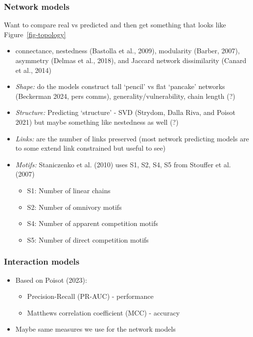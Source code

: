 \documentclass[
  letterpaper,
  DIV=11,
  numbers=noendperiod]{scrartcl}
\providecommand{\tightlist}{%
  \setlength{\itemsep}{0pt}\setlength{\parskip}{0pt}}\usepackage{longtable,booktabs,array}
\begin{document}
\subsubsection{Network models}\label{network-models}

Want to compare real vs predicted and then get something that looks like
Figure~\ref{fig-topology}

\begin{itemize}
\item
  connectance, nestedness (Bastolla et al., 2009), modularity (Barber,
  2007), asymmetry (Delmas et al., 2018), and Jaccard network
  dissimilarity (Canard et al., 2014)
\item
  \emph{Shape:} do the models construct tall `pencil' vs flat `pancake'
  networks (Beckerman 2024, pers comms), generality/vulnerability, chain
  length (?)
\item
  \emph{Structure:} Predicting `structure' - SVD (Strydom, Dalla Riva,
  and Poisot 2021) but maybe something like nestedness as well (?)
\item
  \emph{Links:} are the number of links preserved (most network
  predicting models are to some extend link constrained but useful to
  see)
\item
  \emph{Motifs:} Staniczenko et al. (2010) uses S1, S2, S4, S5 from
  Stouffer et al. (2007)

  \begin{itemize}
  \item
    S1: Number of linear chains
  \item
    S2: Number of omnivory motifs
  \item
    S4: Number of apparent competition motifs
  \item
    S5: Number of direct competition motifs
  \end{itemize}
\end{itemize}

\subsubsection{Interaction models}\label{interaction-models}

\begin{itemize}
\tightlist
\item
  Based on Poisot (2023):

  \begin{itemize}
  \tightlist
  \item
    Precision-Recall (PR-AUC) - performance
  \item
    Matthews correlation coefficient (MCC) - accuracy
  \end{itemize}
\item
  Maybe same measures we use for the network models
\end{itemize}
\end{document}
